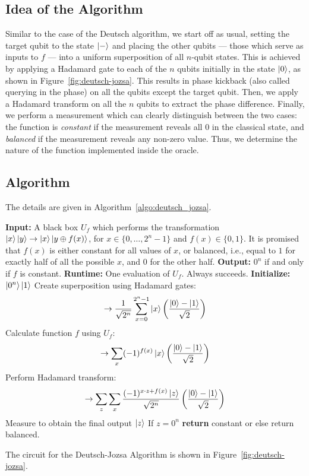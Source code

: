\subsection{Idea of the Algorithm}
Similar to the case of the Deutsch algorithm, we start off as usual, setting the target qubit to the state $\ket{-}$ and placing the other qubits — those which serve as inputs to $f$ — into a uniform superposition of all $n$-qubit states. This is achieved by applying a Hadamard gate to each of the $n$ qubits initially in the state $\ket{0}$, as shown in Figure~\ref{fig:deutsch-jozsa}. This results in phase kickback (also called querying in the phase) on all the qubits except the target qubit. Then, we apply a Hadamard transform on all the $n$ qubits to extract the phase difference. Finally, we perform a measurement which can clearly distinguish between the two cases: the function is \emph{constant} if the measurement reveals all $0$ in the classical state, and \emph{balanced} if the measurement reveals any non-zero value. Thus, we determine the nature of the function implemented inside the oracle.


\subsection{Algorithm}
The details are given in Algorithm~\ref{algo:deutsch_jozsa}.

\begin{algorithm}
    \caption{Deutsch-Jozsa Algorithm}
    \begin{algorithmic}[1]
    \State \textbf{Input:} A black box $U_f$ which performs the transformation $\ket{x}\ket{y} \rightarrow \ket{x}\ket{y \oplus f(x)}$, for $x \in \{0,\ldots,2^n - 1\}$ and $f(x) \in \{0,1\}$. It is promised that $f(x)$ is either constant for all values of $x$, or balanced, i.e., equal to $1$ for exactly half of all the possible $x$, and $0$ for the other half.
    \State \textbf{Output:} $0^n$ if and only if $f$ is constant.
    \State \textbf{Runtime:} One evaluation of $U_f$. Always succeeds.
    \State \textbf{Initialize:} $\ket{0^n}\ket{1}$
    \State Create superposition using Hadamard gates:
    \[
    \rightarrow \frac{1}{\sqrt{2^n}} \sum_{x=0}^{2^n - 1} \ket{x} \left(\frac{\ket{0} - \ket{1}}{\sqrt{2}}\right)
    \]
    \State Calculate function $f$ using $U_f$:
    \[
    \rightarrow \sum_x (-1)^{f(x)} \ket{x} \left(\frac{\ket{0} - \ket{1}}{\sqrt{2}}\right)
    \]
    \State Perform Hadamard transform:
    \[
    \rightarrow \sum_z \sum_x \frac{(-1)^{x \cdot z + f(x)} \ket{z}}{\sqrt{2^n}} \left(\frac{\ket{0} - \ket{1}}{\sqrt{2}}\right)
    \]
    \State Measure to obtain the final output $\ket{z}$
    \State If $z=0^n$ \textbf{return} constant or else return balanced.
    \end{algorithmic}
    \label{algo:deutsch_jozsa}
\end{algorithm}
The circuit for the Deutsch-Jozsa Algorithm is shown in Figure~\ref{fig:deutsch-jozsa}.

